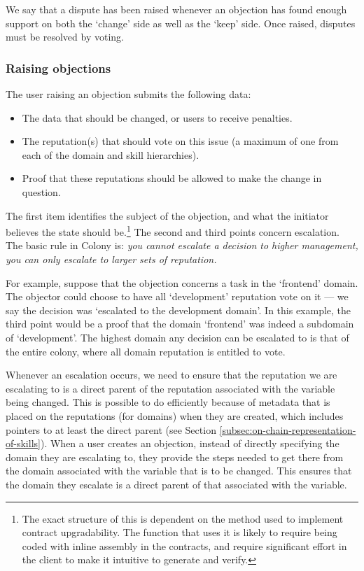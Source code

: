 We say that a dispute has been raised whenever an objection has found enough support on both the `change' side as well as the `keep' side. Once raised, disputes must be resolved by voting.

\subsubsection{Raising objections}\label{subsec:raising-objections}

The user raising an objection submits the following data:
\begin{itemize}
 \item The data that should be changed, or users to receive penalties.
 \item The reputation(s) that should vote on this issue (a maximum of one from each of the domain and skill hierarchies).
 \item Proof that these reputations should be allowed to make the change in question.
\end{itemize}

The first item identifies the subject of the objection, and what the initiator believes the state should be.\footnote{The exact structure of this is dependent on the method used to implement contract upgradability. The function that uses it is likely to require being coded with inline assembly in the contracts, and require significant effort in the client to make it intuitive to generate and verify.} The second and third points concern escalation. The basic rule in Colony is: \textit{you cannot escalate a decision to higher management, you can only escalate to larger sets of reputation.}

For example, suppose that the objection concerns a task in the `frontend' domain. The objector could choose to have all `development' reputation vote on it --- we say the decision was `escalated to the development domain'. In this example, the third point would be a proof that the domain `frontend' was indeed a subdomain of `development'. The highest domain any decision can be escalated to is that of the entire colony, where all domain reputation is entitled to vote.

Whenever an escalation occurs, we need to ensure that the reputation we are escalating to is a direct parent of the reputation associated with the variable being changed. This is possible to do efficiently because of metadata that is placed on the reputations (for domains) when they are created, which includes pointers to at least the direct parent (see Section \ref{subsec:on-chain-representation-of-skills}). When a user creates an objection, instead of directly specifying the domain they are escalating to, they provide the steps needed to get there from the domain associated with the variable that is to be changed. This ensures that the domain they escalate is a direct parent of that associated with the variable.


